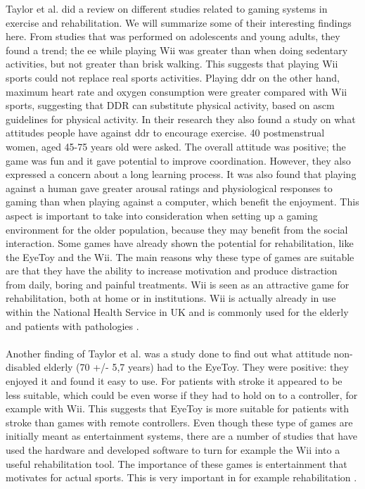 Taylor et al. \cite{taylor2011activity} did a review on different studies related to gaming systems in exercise and rehabilitation. We will summarize some of their interesting findings here. From studies that was performed on adolescents and young adults, they found a trend; the  \ac{ee} while playing Wii was greater than when doing sedentary activities, but not greater than brisk walking. This suggests that playing Wii sports could not replace real sports activities. Playing \ac{ddr} on the other hand, maximum heart rate and oxygen consumption were greater compared with Wii sports, suggesting that DDR can substitute physical activity, based on \ac{ascm} guidelines for physical activity. In their research they also found a study on what attitudes people have against \ac{ddr} to encourage exercise. 40 postmenstrual women, aged 45-75 years old were asked. The overall attitude was positive; the game was fun and it gave potential to improve coordination. However, they also expressed a concern about a long learning process. It was also found that playing against a human gave greater arousal ratings and physiological responses to gaming than when playing against a computer, which benefit the enjoyment. This aspect is important to take into consideration when setting up a gaming environment for the older population, because they may benefit from the social interaction. Some games have already shown the potential for rehabilitation, like the EyeToy and the Wii. The main reasons why these type of games are suitable are that they have the ability to increase motivation and produce distraction from daily, boring and painful treatments. Wii is seen as an attractive game for rehabilitation, both at home or in institutions. Wii is actually already in use within the National Health Service in UK and is commonly used for the elderly and patients with pathologies  \cite{taylor2011activity}. \\ \\
Another finding of Taylor et al. was a study done to find out what attitude non-disabled elderly (70 +/- 5,7 years) had to the EyeToy. They were positive: they enjoyed it and found it easy to use. For patients with stroke it appeared to be less suitable, which could be even worse if they had to hold on to a controller, for example with Wii. This suggests that EyeToy is more suitable for patients with stroke than games with remote controllers.  
Even though these type of games are initially meant as entertainment systems, there are a number of studies that have used the hardware and developed software to turn for example the Wii into a useful rehabilitation tool. The importance of these games is entertainment that motivates for actual sports. This is very important in for example rehabilitation \cite{taylor2011activity}. \\ \\
